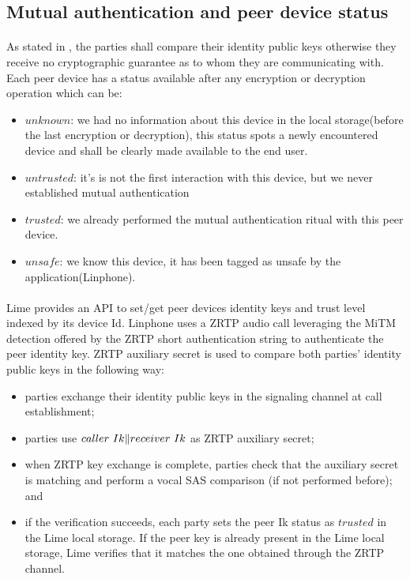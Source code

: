 \documentclass[a4paper,11pt]{article}
\begin{document}
  \subsection{Mutual authentication and peer device status}
    \label{subsec:mutualauthentication}
    \paragraph{}As stated in \cite[section 4.1]{x3dh}, the parties shall compare their identity public keys otherwise they receive no cryptographic guarantee as to whom they are communicating with. Each peer device has a status available after any encryption or decryption operation which can be:
   \begin{itemize}
      \item $unknown$: we had no information about this device in the local storage(before the last encryption or decryption), this status spots a newly encountered device and shall be clearly made available to the end user.
      \item $untrusted$: it's is not the first interaction with this device, but we never established mutual authentication
      \item $trusted$: we already performed the mutual authentication ritual with this peer device.
      \item $unsafe$: we know this device, it has been tagged as unsafe by the application(Linphone).
   \end{itemize}
    \paragraph{}Lime provides an API to set/get peer devices identity keys and trust level indexed by its device Id. Linphone uses a ZRTP\cite{zrtp} audio call leveraging the MiTM detection offered by the ZRTP short authentication string to authenticate the peer identity key. ZRTP auxiliary secret is used to compare both parties' identity public keys in the following way:
    \begin{itemize}
      \item parties exchange their identity public keys in the signaling channel at call establishment;
      \item parties use $caller\ Ik \Arrowvert receiver\ Ik$ as ZRTP auxiliary secret;
      \item when ZRTP key exchange is complete, parties check that the auxiliary secret is matching and perform a vocal SAS comparison (if not performed before); and
      \item if the verification succeeds, each party sets the peer Ik status as $trusted$ in the Lime local storage. If the peer key is already present in the Lime local storage, Lime verifies that it matches the one obtained through the ZRTP channel.
    \end{itemize}
    
\end{document}
